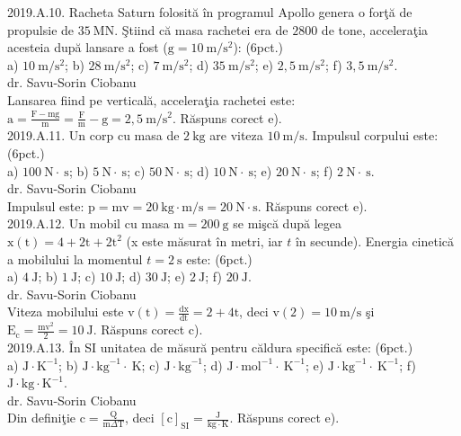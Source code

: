 2019.A.10. Racheta Saturn folosită în programul Apollo genera o forţă de propulsie de $35 \mathrm{~MN}$. Ştiind că masa rachetei era de $2800$ de tone, acceleraţia acesteia după lansare a fost ($\mathrm{g}=10 \mathrm{~m} / \mathrm{s}^{2}$): (6pct.)\\ a) $10 \mathrm{~m} / \mathrm{s}^{2}$; b) $28 \mathrm{~m} / \mathrm{s}^{2}$; c) $7 \mathrm{~m} / \mathrm{s}^{2}$; d) $35 \mathrm{~m} / \mathrm{s}^{2}$; e) $2,5 \mathrm{~m} / \mathrm{s}^{2}$; f) $3,5 \mathrm{~m} / \mathrm{s}^{2}$.\\ dr. Savu-Sorin Ciobanu\\ Lansarea fiind pe verticală, acceleraţia rachetei este:\\ $\mathrm{a}=\frac{\mathrm{F}-\mathrm{mg}}{\mathrm{m}}=\frac{\mathrm{F}}{\mathrm{m}}-\mathrm{g}=2,5 \mathrm{~m} / \mathrm{s}^{2}$. Răspuns corect e).\\

2019.A.11. Un corp cu masa de $2 \mathrm{~kg}$ are viteza $10 \mathrm{~m} / \mathrm{s}$. Impulsul corpului este: (6pct.)\\ a) $100 \mathrm{~N} \cdot \mathrm{~s}$; b) $5 \mathrm{~N} \cdot \mathrm{~s}$; c) $50 \mathrm{~N} \cdot \mathrm{~s}$; d) $10 \mathrm{~N} \cdot \mathrm{~s}$; e) $20 \mathrm{~N} \cdot \mathrm{~s}$; f) $2 \mathrm{~N} \cdot \mathrm{~s}$.\\ dr. Savu-Sorin Ciobanu\\ Impulsul este: $\mathrm{p}=\mathrm{mv}=20 \mathrm{~kg} \cdot \mathrm{m} / \mathrm{s}=20 \mathrm{~N} \cdot \mathrm{s}$. Răspuns corect e).\\

2019.A.12. Un mobil cu masa $\mathrm{m}=200 \mathrm{~g}$ se mişcă după legea $\mathrm{x}(\mathrm{t})=4+2 \mathrm{t}+2 \mathrm{t}^{2}$ (x este măsurat în metri, iar $t$ în secunde). Energia cinetică a mobilului la momentul $t=2 \mathrm{~s}$ este: (6pct.)\\ a) $4 \mathrm{~J}$; b) $1 \mathrm{~J}$; c) $10 \mathrm{~J}$; d) $30 \mathrm{~J}$; e) $2 \mathrm{~J}$; f) $20 \mathrm{~J}$.\\ dr. Savu-Sorin Ciobanu\\ Viteza mobilului este $\mathrm{v}(\mathrm{t})=\frac{\mathrm{dx}}{\mathrm{dt}}=2+4 \mathrm{t}$, deci $\mathrm{v}(2)=10 \mathrm{~m} / \mathrm{s}$ şi $\mathrm{E}_{\mathrm{c}}=\frac{\mathrm{mv}^{2}}{2}=10 \mathrm{~J}$. Răspuns corect c).\\

2019.A.13. În SI unitatea de măsură pentru căldura specifică este: (6pct.)\\ a) $\mathrm{J} \cdot \mathrm{K}^{-1}$; b) $\mathrm{J} \cdot \mathrm{kg}^{-1} \cdot \mathrm{~K}$; c) $\mathrm{J} \cdot \mathrm{kg}^{-1}$; d) $\mathrm{J} \cdot \mathrm{mol}^{-1} \cdot \mathrm{~K}^{-1}$; e) $\mathrm{J} \cdot \mathrm{kg}^{-1} \cdot \mathrm{~K}^{-1}$; f) $\mathrm{J} \cdot \mathrm{kg} \cdot \mathrm{K}^{-1}$.\\ dr. Savu-Sorin Ciobanu\\ Din definiţie $\mathrm{c}=\frac{\mathrm{Q}}{\mathrm{m} \Delta \mathrm{T}}$, deci $\left[\mathrm{c}\right]_{\mathrm{SI}}=\frac{\mathrm{J}}{\mathrm{kg} \cdot \mathrm{K}}$. Răspuns corect e).\\

